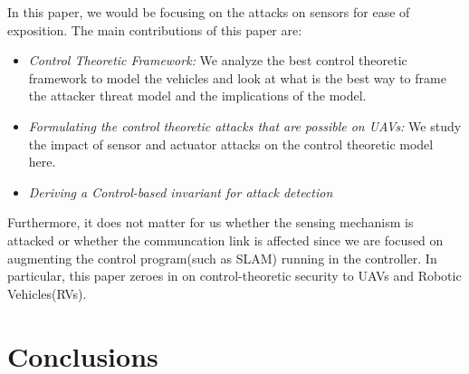 In this paper, we would be focusing on the attacks on sensors for ease of exposition. The main contributions of this paper are:

\begin{itemize}
    \item \textit{Control Theoretic Framework:} We analyze the best control theoretic framework to model the vehicles and look at what is the best way to frame the attacker threat model and the implications of the model.
    \item \textit{Formulating the control theoretic attacks that are possible on UAVs:} We study the impact of sensor and actuator attacks on the control theoretic model here.
    \item \textit{Deriving a Control-based invariant for attack detection}
\end{itemize}

Furthermore, it does not matter for us whether the sensing mechanism is attacked or whether the communcation link is affected since we are focused on augmenting the control program(such as SLAM) running in the controller. In particular, this paper zeroes in on control-theoretic security to UAVs and Robotic Vehicles(RVs).






\section{Conclusions}


\appendix



%

